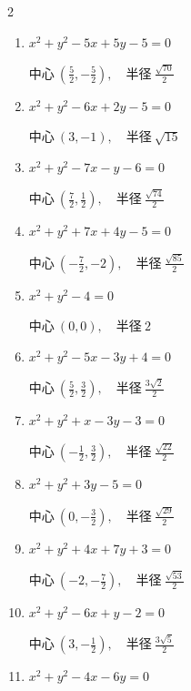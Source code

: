 \begin{multicols}{2}
\begin{enumerate}
  \item $x^{2}+y^{2}-5x+5y-5=0$

        $\displaystyle 中心\: \left(\frac{5}{2},-\frac{5}{2}\right), \quad 半径 \ \frac{\sqrt{70}}{2}$

  \item $x^{2}+y^{2}-6x+2y-5=0$

        $\displaystyle 中心\: \left(3,-1\right), \quad 半径 \ \sqrt{15}$

  \item $x^{2}+y^{2}-7x-y-6=0$

        $\displaystyle 中心\: \left(\frac{7}{2},\frac{1}{2}\right), \quad 半径 \ \frac{\sqrt{74}}{2}$

  \item $x^{2}+y^{2}+7x+4y-5=0$

        $\displaystyle 中心\: \left(-\frac{7}{2},-2\right), \quad 半径 \ \frac{\sqrt{85}}{2}$

  \item $x^{2}+y^{2}-4=0$

        $\displaystyle 中心\: \left(0,0\right), \quad 半径 \ 2$

  \item $x^{2}+y^{2}-5x-3y+4=0$

        $\displaystyle 中心\: \left(\frac{5}{2},\frac{3}{2}\right), \quad 半径 \ \frac{3\sqrt{2}}{2}$

  \item $x^{2}+y^{2}+x-3y-3=0$

        $\displaystyle 中心\: \left(-\frac{1}{2},\frac{3}{2}\right), \quad 半径 \ \frac{\sqrt{22}}{2}$

  \item $x^{2}+y^{2}+3y-5=0$

        $\displaystyle 中心\: \left(0,-\frac{3}{2}\right), \quad 半径 \ \frac{\sqrt{29}}{2}$

\columnbreak %

  \item $x^{2}+y^{2}+4x+7y+3=0$

        $\displaystyle 中心\: \left(-2,-\frac{7}{2}\right), \quad 半径 \ \frac{\sqrt{53}}{2}$

  \item $x^{2}+y^{2}-6x+y-2=0$

        $\displaystyle 中心\: \left(3,-\frac{1}{2}\right), \quad 半径 \ \frac{3\sqrt{5}}{2}$

  \item $x^{2}+y^{2}-4x-6y=0$


\end{enumerate}
\end{multicols}

